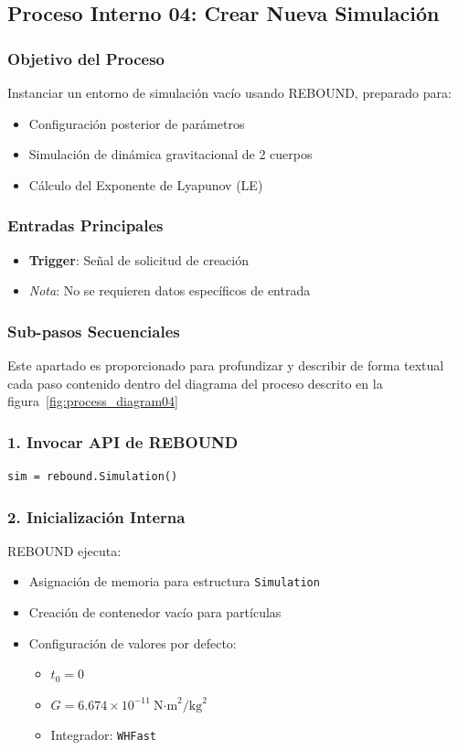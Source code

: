 \subsection{Proceso Interno 04: Crear Nueva Simulación}

\subsubsection{Objetivo del Proceso}
Instanciar un entorno de simulación vacío usando REBOUND, preparado para:
\begin{itemize}
    \item Configuración posterior de parámetros
    \item Simulación de dinámica gravitacional de 2 cuerpos
    \item Cálculo del Exponente de Lyapunov (LE)
\end{itemize}

\subsubsection{Entradas Principales}
\begin{itemize}
    \item \textbf{Trigger}: Señal de solicitud de creación
    \item \textit{Nota}: No se requieren datos específicos de entrada
\end{itemize}

\subsubsection{Sub-pasos Secuenciales}
Este apartado es proporcionado para profundizar y describir de forma textual cada paso contenido dentro del diagrama del proceso descrito en la figura~\ref{fig:process_diagram04}
\subsubsection*{1. Invocar API de REBOUND}
\begin{verbatim}
sim = rebound.Simulation()
\end{verbatim}

\subsubsection*{2. Inicialización Interna}
REBOUND ejecuta:
\begin{itemize}
    \item Asignación de memoria para estructura \texttt{Simulation}
    \item Creación de contenedor vacío para partículas
    \item Configuración de valores por defecto:
    \begin{itemize}
        \item $t_0 = 0$
        \item $G = 6.674\times10^{-11}\ \text{N·m}^2/\text{kg}^2$
        \item Integrador: \texttt{WHFast}
    \end{itemize}
\end{itemize}

